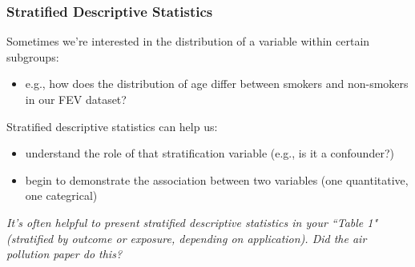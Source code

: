 \documentclass[12pt, 
hyperref={colorlinks=true, linkcolor=blue, urlcolor=cyan}]{beamer}
\begin{document}
\begin{frame}
\frametitle{Stratified Descriptive Statistics} %

Sometimes we're interested in the distribution of a variable within certain subgroups: \vspace{-0.3cm}
\begin{itemize}
\item e.g., how does the distribution of age differ between smokers and non-smokers in our FEV dataset? %
\end{itemize}

Stratified descriptive statistics can help us:\vspace{-0.3cm}
\begin{itemize}
\item understand the role of that  stratification variable (e.g., is it a confounder?)
\item begin to demonstrate the association between two variables (one quantitative, one categrical)
\end{itemize}

\begin{footnotesize} \textit{It's often helpful to present stratified descriptive statistics in your ``Table 1" (stratified by outcome or exposure, depending on application). Did the air pollution paper do this?} \end{footnotesize}

\end{frame}
\end{document}
